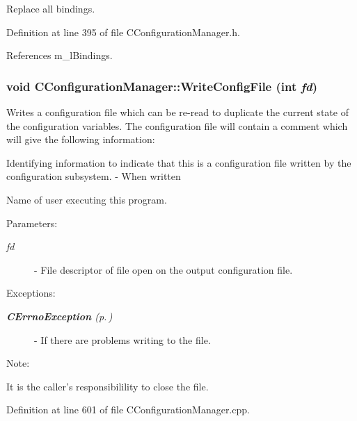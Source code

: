 Replace all bindings.



Definition at line 395 of file CConfiguration\-Manager.h.

References m\_\-l\-Bindings.
\subsubsection{\setlength{\rightskip}{0pt plus 5cm}void CConfiguration\-Manager::Write\-Config\-File (int {\em fd})}\label{classCConfigurationManager_a22}


Writes a configuration file which can be re-read to duplicate the current state of the configuration variables. The configuration file will contain a comment which will give the following information:\begin{CompactItemize}
\item 
Identifying information to indicate that this is a configuration file written by the configuration subsystem. - When written\item 
Name of user executing this program.\end{CompactItemize}
\begin{Desc}
\item[Parameters: ]\par
\begin{description}
\item[{\em 
fd}]- File descriptor of file open on the output configuration file.\end{description}
\end{Desc}
\begin{Desc}
\item[Exceptions: ]\par
\begin{description}
\item[{\em 
{\bf CErrno\-Exception} {\rm (p.\,\pageref{classCErrnoException})}}] - If there are problems writing to the file.\end{description}
\end{Desc}
\begin{Desc}
\item[Note: ]\par
It is the caller's responsibilility to close the file. \end{Desc}


Definition at line 601 of file CConfiguration\-Manager.cpp.

